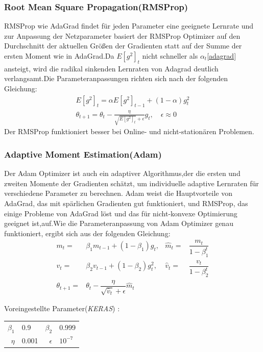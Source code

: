 \documentclass[12pt,a4paper]{scrartcl}
\numberwithin{equation}{section}
\begin{document}
\subsubsection{Root Mean Square Propagation(RMSProp)}
RMSProp wie AdaGrad findet für jeden Parameter eine geeignete Lernrate und zur Anpassung der Netzparameter basiert der RMSProp Optimizer auf den Durchschnitt der aktuellen Größen der Gradienten statt auf der Summe der ersten Moment wie in AdaGrad.Da $ E[g^2]_t $ nicht schneller als $ \alpha_{t} $\eqref{adagrad} ansteigt, wird die radikal sinkenden Lernraten von Adagrad deutlich verlangsamt.Die Parameteranpassungen richten sich nach der folgenden Gleichung:
\begin{equation}\label{RMSProp}
\begin{split}
E[g^2]_t =\alpha E[g^2]_{t-1} +(1-\alpha)g^2_{t}\\
\theta_{t+1} = \theta_{t} -\frac{\eta}{\sqrt{E[g^2]_t}+\epsilon} g_t, \quad  \epsilon \approx 0
\end{split}
\end{equation}
Der RMSProp funktioniert besser bei Online- und nicht-stationären Problemen.

\subsubsection{Adaptive Moment Estimation(Adam)}
Der Adam\cite{adam} Optimizer ist auch ein adaptiver Algorithmus,der die ersten und zweiten Momente der Gradienten schätzt, um individuelle adaptive Lernraten für verschiedene Parameter zu berechnen.
Adam weist die Hauptvorteile von AdaGrad, das mit spärlichen Gradienten gut funktioniert, und RMSProp, das einige Probleme von AdaGrad löst und das für nicht-konvexe Optimierung geeignet ist,auf.Wie die Parameteranpassung von Adam Optimizer genau funktioniert, ergibt sich aus der folgenden Gleichung: 
\begin{equation}\label{ADAM}
\begin{aligned}
m_{t}=& \beta_{1}m_{t-1}+(1-\beta_{1})g_{t}, &  \widehat{m}_{t} =& \dfrac{m_{t}}{1-\beta_{1}^t}\\
v_{t}=& \beta_{2}v_{t-1}+(1-\beta_{2})g^2_t,&\widehat{v}_{t} =&\dfrac{v_t}{1-\beta_{2}^t}\\
\theta_{t+1} =& \theta_{t} -\dfrac{\eta}{\sqrt{\widehat{v}_{t}}+\epsilon}\widehat{m}_{t}
\end{aligned}
\end{equation}
\begin{center}
	Voreingestellte Parameter(\textit{KERAS}) :
	\begin{tabular}{r@{: }l r@{: }l}
		$ \beta_{1}$ & 0.9 &$ \beta_{2} $& 0.999\\
		$ \eta$& 0.001& $ \epsilon $ & $ 10^{-7} $
	\end{tabular}
\end{center}
\end{document}

